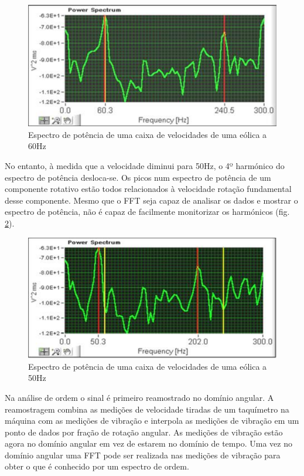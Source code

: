 \begin{figure}[H]
\centering
\includegraphics[scale=0.3]{figs/power_spectrum1}
\caption{Espectro de potência de uma caixa de velocidades de uma eólica a 60Hz}\label{power espectrum 1}
\end{figure}


No entanto, à medida que a velocidade diminui para 50Hz, o 4º harmónico do espectro de potência desloca-se. Os picos num espectro de potência de um componente rotativo estão todos relacionados à velocidade rotação  fundamental desse componente. Mesmo que o FFT seja capaz de analisar os dados e mostrar o espectro de potência, não é capaz de facilmente monitorizar os harmónicos (fig. \ref{power espectrum 2}).

\begin{figure}[H]
\centering
\includegraphics[scale=0.3]{figs/power_spectrum2}
\caption{Espectro de potência de uma caixa de velocidades de uma eólica a 50Hz}\label{power espectrum 2}
\end{figure}

Na análise de ordem o sinal é primeiro reamostrado no domínio angular. A reamostragem combina as medições de velocidade tiradas de um taquímetro na máquina com as medições de vibração e interpola as medições de vibração em um ponto de dados por fração de rotação angular. As medições de vibração estão agora no domínio angular em vez de estarem no domínio de tempo. Uma vez no domínio angular uma FFT pode ser realizada nas medições de vibração para obter o que é conhecido por um espectro de ordem.


